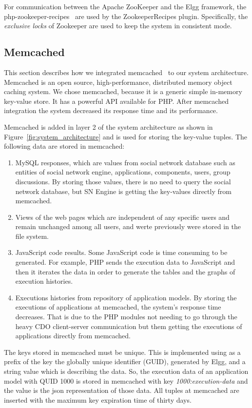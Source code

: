 For communication between the Apache ZooKeeper and the Elgg framework, the php-zookeeper-recipes~\cite{zookeeper_recipes_url} are used by the ZookeeperRecipes plugin. Specifically, the {\it exclusive locks} of Zookeeper are used to keep the system in consistent mode.

\subsection{Memcached}
\label{sec:memcache_implementation}
This section describes how we integrated memcached~\cite{memcache_url} to our system architecture. Memcached is an open source, high-performance, distributed memory object caching system. We chose memcached, because it is a generic simple in-memory key-value store. It has a powerful API available for PHP. After memcached integration the system decreased its response time and its performance.

Memcached is added in layer 2 of the system architecture as shown in Figure~\ref{fig:system_architecture} and is used for storing the key-value tuples. The following data are stored in memcached: 
\begin{enumerate}
\item MySQL responses, which are values from social network database such as entities of social network engine, applications, components, users, group discussions. By storing those values, there is no need to query the social network database, but SN Engine is getting the key-values directly from memcached.
\item Views of the web pages which are independent of any specific users and remain unchanged among all users, and werte previously were stored in the file system.
\item JavaScript code results. Some JavaScript code is time consuming to be generated. For example, PHP sends the execution data to JavaScript and then it iterates the data in order to generate the tables and the graphs of execution histories.
\item Executions histories from repository of application models. By storing the executions of applications at memcached, the system's response time decreases. That is due to the PHP modules not needing to go through the heavy CDO client-server communication but them getting the executions of applications directly from memcached.
\end{enumerate}

The keys stored in memcached must be unique. This is implemented using as a prefix of the key the globally unique identifier (GUID), generated by Elgg, and a string value which is describing the data. So, the execution data of an application model with QUID 1000 is stored in memcached with key {\it 1000:execution-data} and the value is the json representation of those data. All tuples at memcached are inserted with the maximum key expiration time of thirty days.

